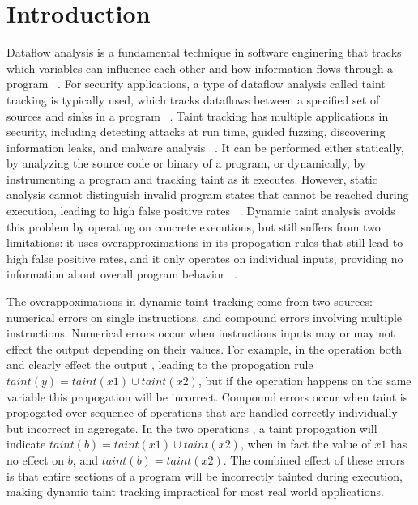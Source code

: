 \section{Introduction}
Dataflow analysis is a fundamental technique in software enginering that tracks which variables can influence each other and how information flows through a program ~\cite{kildall1973unified, fosdick2011data}. For security applications, a type of dataflow analysis called taint tracking is typically used, which tracks dataflows between a specified set of sources and sinks in a program ~\cite{newsome2005dynamic}. Taint tracking has multiple applications in security, including detecting attacks at run time, guided fuzzing, discovering information leaks, and malware analysis ~\cite{clause2007dytan, schwartz2010all, ganesh2009taint, rawat2017vuzzer, arzt2014flowdroid, yan2012droidscope}. It can be performed either statically, by analyzing the source code or binary of a program, or dynamically, by instrumenting a program and tracking taint as it executes. However, static analysis cannot distinguish invalid program states that cannot be reached during execution, leading to high false positive rates ~\cite{jovanovic2006pixy}. Dynamic taint analysis avoids this problem by operating on concrete executions, but still suffers from two limitations: it uses overapproximations in its propogation rules that still lead to high false positive rates, and it only operates on individual inputs, providing no information about overall program behavior ~\cite{balzarotti2008saner}. 

The overappoximations in dynamic taint tracking come from two sources: numerical errors on single instructions, and compound errors involving multiple instructions. Numerical errors occur when instructions inputs may or may not effect the output depending on their values. For example, in the operation  both  and   clearly effect the output , leading to the propogation rule $taint(y) = taint(x1) \cup taint(x2)$, but if the operation happens on the same variable  this propogation will be incorrect. Compound errors occur when taint is propogated over sequence of operations that are handled correctly individually but incorrect in aggregate. In the two operations , a taint propogation will indicate $taint(b) = taint(x1) \cup taint(x2)$, when in fact the value of $x1$ has no effect on $b$, and $taint(b) = taint(x2)$. The combined effect of these errors is that entire sections of a program will be incorrectly tainted during execution, making dynamic taint tracking impractical for most real world applications. 


